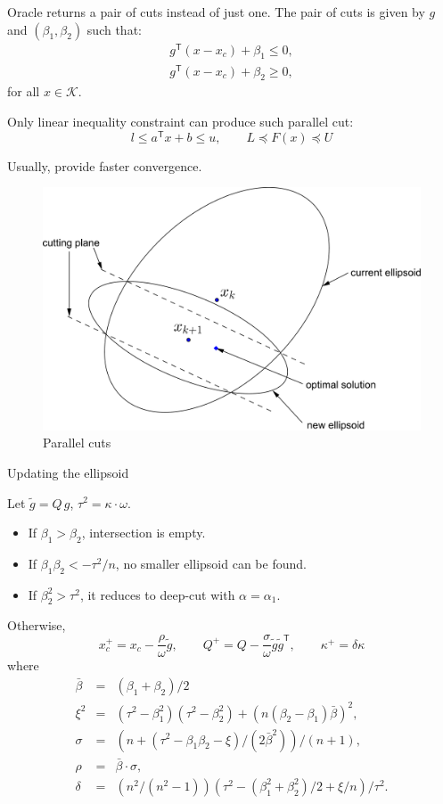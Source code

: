 \documentclass[final,leqno]{siamltex}
\providecommand{\tightlist}{%
  \setlength{\itemsep}{0pt}\setlength{\parskip}{0pt}}
\begin{document}
Oracle returns a pair of cuts instead of just one.
The pair of cuts is given by \(g\) and \((\beta_1, \beta_2)\) such that:
\[\begin{array}{l}
    g^\mathsf{T} (x - x_c) + \beta_1 \leq 0,  \\
    g^\mathsf{T} (x - x_c) + \beta_2 \geq 0,
  \end{array}
\]
for all \(x \in \mathcal{K}\).

Only linear inequality constraint can produce such parallel cut:
\[ l \leq a^\mathsf{T} x + b \leq u, \qquad L \preceq F(x) \preceq U
\]

Usually, provide faster convergence.

\begin{figure}
\hypertarget{fig:parallel_cut}{%
\centering
\includegraphics{ellipsoid.files/parallel_cut.pdf}
\caption{Parallel cuts}\label{fig:parallel_cut}
}
\end{figure}

Updating the ellipsoid

Let \(\tilde{g} = Q\,g\), \(\tau^2 = \kappa\cdot\omega\).

\begin{itemize}
\tightlist
\item
  If \(\beta_1 > \beta_2\), intersection is empty.
\item
  If \(\beta_1 \beta_2 < -\tau^2/n\), no smaller ellipsoid can be found.
\item
  If \(\beta_2^2 > \tau^2\), it reduces to deep-cut with \(\alpha = \alpha_1\).
\end{itemize}

Otherwise,
\[x_c^+ = x_c - \frac{\rho}{\omega} \tilde{g}, \qquad
    Q^+ = Q - \frac{\sigma}{\omega} \tilde{g}\tilde{g}^\mathsf{T}, \qquad
    \kappa^+ =  \delta \kappa
\]
where
\[\begin{array}{lll}
      \bar{\beta} &=& (\beta_1 + \beta_2)/2 \\
      \xi^2 &=& (\tau^2 - \beta_1^2)(\tau^2 - \beta_2^2) + (n(\beta_2 - \beta_1)\bar{\beta})^2, \\
      \sigma &=& (n + (\tau^2 - \beta_1\beta_2 - \xi)/(2\bar{\beta}^2)) / (n + 1), \\
      \rho &=& \bar{\beta}\cdot\sigma, \\
      \delta &=& (n^2/(n^2-1)) (\tau^2 - (\beta_1^2 + \beta_2^2)/2 + \xi/n) / \tau^2 .
\end{array}
\]
\end{document}

